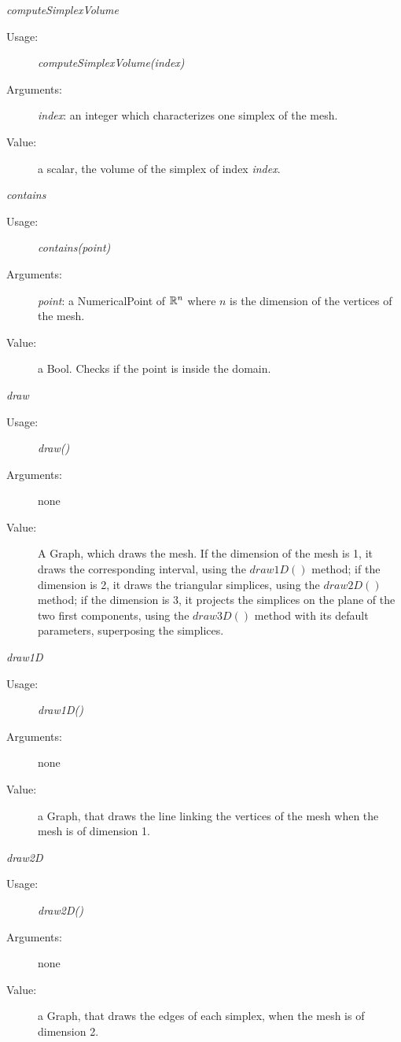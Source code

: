 \begin{description}
\begin{description}
\item \textit{computeSimplexVolume}\rule{0pt}{1em}
\begin{description}
\item[Usage:] \textit{computeSimplexVolume(index)}
\item[Arguments:] \textit{index}: an integer which  characterizes one simplex of the mesh.
\item[Value:] a scalar, the volume of the simplex of index \textit{index}.
\end{description}
\bigskip

\item \textit{contains}
\begin{description}
\item[Usage:] \textit{contains(point)}
\item[Arguments:] \textit{point}: a NumericalPoint of ${\mathbb R}^n$ where $n$ is the dimension of the vertices of the mesh.
\item[Value:] a Bool. Checks if the point is inside the domain.
\end{description}
\bigskip

\item \textit{draw}
\begin{description}
\item[Usage:] \textit{draw()}
\item[Arguments:] none
\item[Value:] A Graph, which draws the mesh. If the dimension of the mesh is 1, it draws the corresponding interval, using the $draw1D()$ method; if the dimension is 2, it draws the triangular simplices, using the $draw2D()$ method; if the dimension is 3, it projects the simplices on the plane of the two first components, using the $draw3D()$ method with its default parameters, superposing the simplices.
\end{description}
\bigskip

\item \textit{draw1D}
\begin{description}
\item[Usage:] \textit{draw1D()}
\item[Arguments:] none
\item[Value:] a Graph, that draws the line linking the vertices of the mesh when the mesh is of dimension 1.
\end{description}
\bigskip

\item \textit{draw2D}
\begin{description}
\item[Usage:] \textit{draw2D()}
\item[Arguments:] none
\item[Value:] a Graph, that draws the edges of each simplex, when the mesh is of dimension 2.
\end{description}
\bigskip


\end{description}
\end{description}
